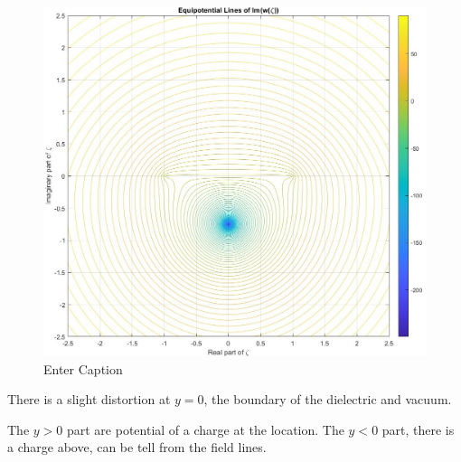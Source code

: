     \begin{figure}[H]
        \centering
        \includegraphics[width=1.\linewidth]{Figs/whole slit vot.jpg}
        \caption{Enter Caption}
        \label{fig:enter-label}
    \end{figure}

    There is a slight distortion at $y=0$, the boundary of the dielectric and vacuum.

    The $y>0$ part are potential of a charge at the location. The $y<0$ part, there is a charge above, can be tell from the field lines.
    
\pagebreak